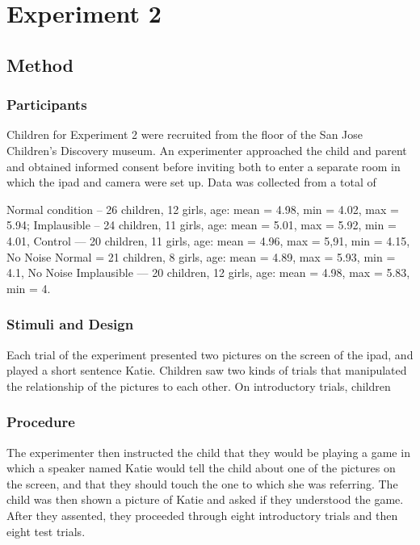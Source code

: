 \documentclass[man,floatsintext]{apa6}
\begin{document}
\section{Experiment 2}

\subsection{Method}

\subsubsection{Participants}

Children for Experiment 2 were recruited from the floor of the San Jose Children's Discovery museum. An experimenter approached the child and parent and obtained informed consent before inviting both to enter a separate room in which the ipad and camera were set up. Data was collected from a total of 

 Normal condition -- 26 children, 12 girls, age: mean = 4.98, min = 4.02, max = 5.94; Implausible -- 24 children, 11 girls, age: mean = 5.01, max = 5.92, min = 4.01, Control --- 20 children, 11 girls, age: mean = 4.96, max = 5,91, min = 4.15, No Noise Normal = 21 children, 8 girls, age: mean = 4.89, max = 5.93, min = 4.1, No Noise Implausible --- 20 children, 12 girls, age: mean = 4.98, max = 5.83, min = 4. 
 
\subsubsection{Stimuli and Design}

Each trial of the experiment presented two pictures on the screen of the ipad, and played a short sentence Katie. Children saw two kinds of trials that manipulated the relationship of the pictures to each other. On introductory trials, children 

\subsubsection{Procedure}
The experimenter then instructed the child that they would be playing a game in which a speaker named Katie would tell the child about one of the pictures on the screen, and that they should touch the one to which she was referring. The child was then shown a picture of Katie and asked if they understood the game. After they assented, they proceeded through eight introductory trials and then eight test trials. 
\end{document}
